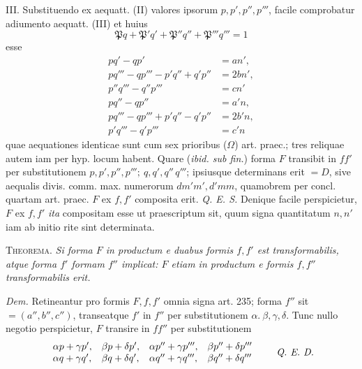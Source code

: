III. Substituendo ex aequatt. (II) valores ipsorum $p,p',p'',p'''$, facile comprobatur adiumento aequatt. (III) et huius
\[
\mathfrak{P}q+\mathfrak{P}'q'+\mathfrak{P}''q''+\mathfrak{P}'''q'''=1
\]
esse
\[
\begin{aligned}
pq'-qp'&=an',\\ pq'''-qp'''-p'q''+q'p''&=2bn',\\p''q'''-q''p'''&=cn'\\
pq''-qp''&=a'n,\\ pq'''-qp'''+p'q''-q'p''&=2b'n,\\p'q'''-q'p'''&=c'n
\end{aligned}
\]
quae aequationes identicae sunt cum sex prioribus ($\Omega$) art. praec.; tres reliquae autem iam per hyp. locum habent. Quare (\textit{ibid. sub fin.}) forma $F$ transibit in $ff'$ per substitutionem $p,p',p'',p''';\ q,q',q''\,q'''$; ipsiusque determinans erit $=D$, sive aequalis divis. comm. max. numerorum $dm'm',d'mm$, quamobrem per concl. quartam art. praec. $F$ ex $f,f'$ composita erit. \textit{Q. E. S.} Denique facile perspicietur, $F$ ex $f,f'$ \textit{ita} compositam esse ut praescriptum sit, quum signa quantitatum $n,n'$ iam ab initio rite sint determinata.

\textsc{Theorema.} \textit{Si forma $F$ in productum e duabus formis $f,f'$ est transformabilis, atque forma $f'$ formam $f''$ implicat: $F$ etiam in productum e formis $f,f''$ transformabilis erit.}

\textit{Dem.} Retineantur pro formis $F,f,f'$ omnia signa art. 235; forma $f''$ sit $=(a'',b'',c'')$, transeatque $f'$ in $f''$ per substitutionem $\alpha.\ \beta,\gamma,\delta$. Tunc nullo negotio perspicietur, $F$ transire in $ff''$ per substitutionem
\[
\begin{array}{llll}
\alpha p+\gamma p',&\beta p+\delta p',&\alpha p''+\gamma p''',&\beta p''+\delta p'''\\
\alpha q+\gamma q',&\beta q+\delta q',&\alpha q''+\gamma q''',&\beta q''+\delta q'''
\end{array}
\qquad\text{\textit{Q. E. D.}}
\]

